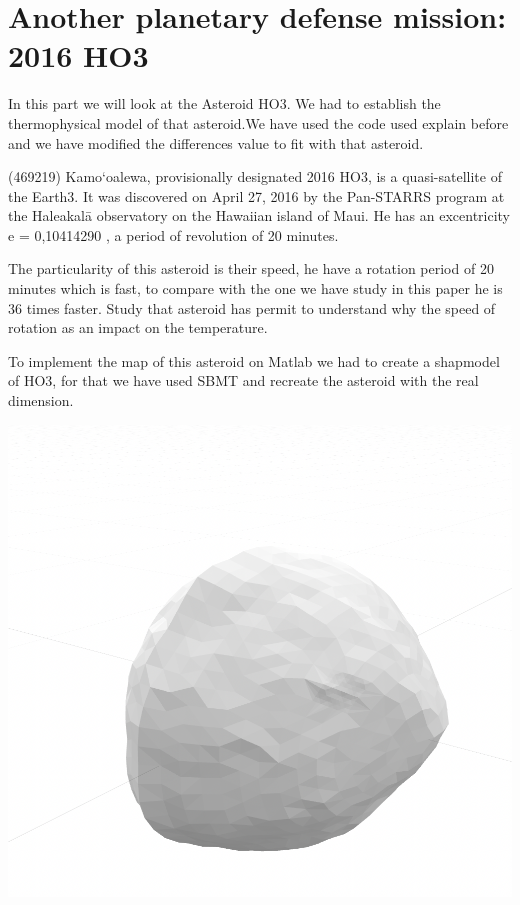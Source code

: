 \section{Another planetary defense mission: 2016 HO3}
\label{sec:7}

In this part we will look at the Asteroid HO3. We had to establish the thermophysical model of that asteroid.We have used the code used explain before and we have modified the differences value to fit with that asteroid.\newline

(469219) Kamo‘oalewa, provisionally designated 2016 HO3, is a quasi-satellite of the Earth3. It was discovered on April 27, 2016 by the Pan-STARRS program at the Haleakalā observatory on the Hawaiian island of Maui.\newline
He has an excentricity e = 0,10414290 , a period of revolution of 20 minutes.

The particularity of this asteroid is their speed, he have a rotation period of 20 minutes which is fast, to compare with the one we have study in this paper he is 36 times faster. Study that asteroid has permit to understand why the speed of rotation as an impact on the temperature.

To implement the map of this asteroid on Matlab we had to create a shapmodel of HO3, for that we have used SBMT and recreate the asteroid with the real dimension.\newline 

\begin{center}
    \captionsetup{type=figure}
    \includegraphics[scale=0.4]{rsc/HO3_shapemodel.png}
\end{center}

